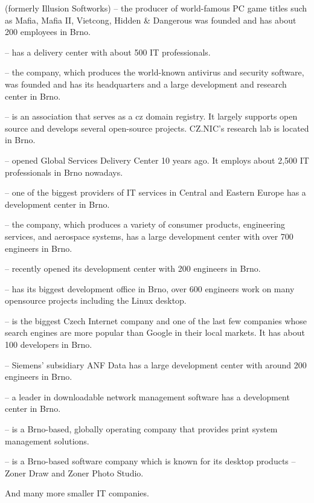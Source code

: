 \documentclass[10pt,a4paper]{article}
\begin{document}
\begin{description}
\item[\color{kdedarker} 2K Czech] (formerly Illusion Softworks) -- the producer of world-famous PC game titles such as Mafia, Mafia II, Vietcong, Hidden \& Dangerous was founded and has about 200 employees in Brno.
\item[\color{kdedarker} Accenture] -- has a delivery center with about 500 IT professionals.
\item[\color{kdedarker} AVG Technologies] -- the company, which produces the world-known antivirus and security software, was founded and has its headquarters and a large development and research center in Brno.
\item[\color{kdedarker} CZ.NIC] -- is an association that serves as a cz domain registry. It largely supports open source and develops several open-source projects. CZ.NIC's research lab is located in Brno.
\item[\color{kdedarker} IBM] -- opened Global Services Delivery Center 10 years ago. It employs about 2,500 IT professionals in Brno nowadays.
\item[\color{kdedarker} IBA] -- one of the biggest providers of IT services in Central and Eastern Europe has a development center in Brno.
\item[\color{kdedarker} Honeywell] -- the company, which produces a variety of consumer products, engineering services, and aerospace systems, has a large development center with over 700 engineers in Brno.
\item[\color{kdedarker} NetSuite] -- recently opened its development center with 200 engineers in Brno.
\item[\color{kdedarker} Red Hat] -- has its biggest development office in Brno, over 600 engineers work on many opensource projects including the Linux desktop.
\item[\color{kdedarker} Seznam.cz] -- is the biggest Czech Internet company and one of the last few companies whose search engines are more popular than Google in their local markets. It has about 100 developers in Brno.
\item[\color{kdedarker} Siemens] -- Siemens' subsidiary ANF Data has a large development center with around 200 engineers in Brno.
\item[\color{kdedarker} Solar Winds] -- a leader in downloadable network management software has a development center in Brno.
\item[\color{kdedarker} Y Soft] -- is a Brno-based, globally operating company that provides print system management solutions.
\item[\color{kdedarker} ZONER software] -- is a Brno-based software company which is known for its desktop products -- Zoner Draw and Zoner Photo Studio.
\item And many more smaller IT companies.
\end{description}
\end{document}
